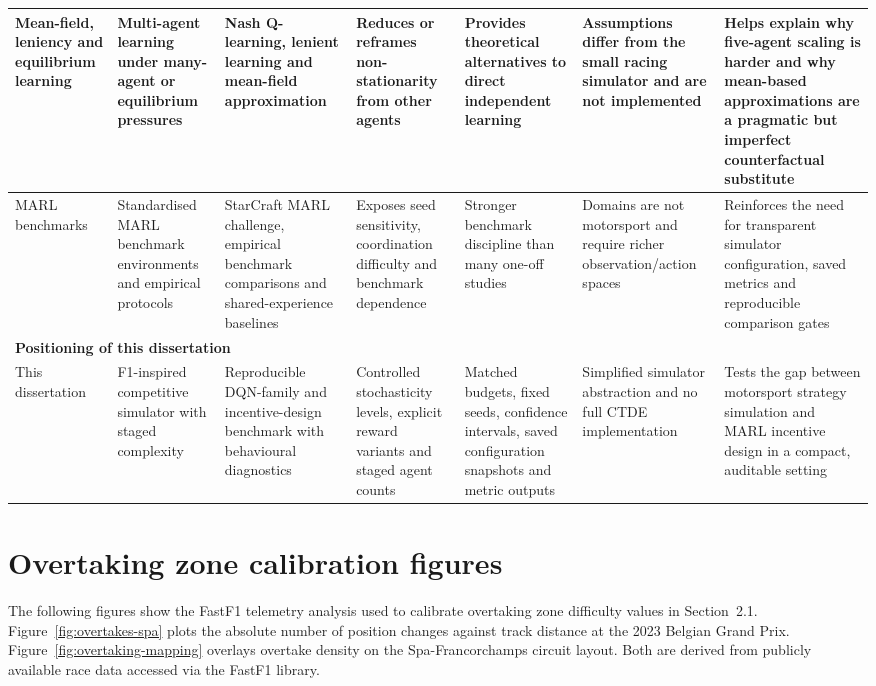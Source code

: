 \begin{appendices}
\begin{longtable}{|p{2.0cm}|p{2.1cm}|p{2.0cm}|p{2.0cm}|p{2.0cm}|p{2.2cm}|p{2.4cm}|}
\hline
Mean-field, leniency and equilibrium learning \citep{hu2003nash,wei2016lenient,yang2018meanfield} & Multi-agent learning under many-agent or equilibrium pressures & Nash Q-learning, lenient learning and mean-field approximation & Reduces or reframes non-stationarity from other agents & Provides theoretical alternatives to direct independent learning & Assumptions differ from the small racing simulator and are not implemented & Helps explain why five-agent scaling is harder and why mean-based approximations are a pragmatic but imperfect counterfactual substitute \\
\hline
MARL benchmarks \citep{samvelyan2019smac,papoudakis2021benchmarking,christianos2020seac} & Standardised MARL benchmark environments and empirical protocols & StarCraft MARL challenge, empirical benchmark comparisons and shared-experience baselines & Exposes seed sensitivity, coordination difficulty and benchmark dependence & Stronger benchmark discipline than many one-off studies & Domains are not motorsport and require richer observation/action spaces & Reinforces the need for transparent simulator configuration, saved metrics and reproducible comparison gates \\
\hline
\multicolumn{7}{|l|}{\textbf{Positioning of this dissertation}}\\
\hline
This dissertation & F1-inspired competitive simulator with staged complexity & Reproducible DQN-family and incentive-design benchmark with behavioural diagnostics & Controlled stochasticity levels, explicit reward variants and staged agent counts & Matched budgets, fixed seeds, confidence intervals, saved configuration snapshots and metric outputs & Simplified simulator abstraction and no full CTDE implementation & Tests the gap between motorsport strategy simulation and MARL incentive design in a compact, auditable setting \\
\hline
\end{longtable}
\endgroup



\section*{Overtaking zone calibration figures}
\label{sec:overtaking-figures}

The following figures show the FastF1 telemetry analysis used to calibrate overtaking zone difficulty values in Section~2.1. Figure~\ref{fig:overtakes-spa} plots the absolute number of position changes against track distance at the 2023 Belgian Grand Prix. Figure~\ref{fig:overtaking-mapping} overlays overtake density on the Spa-Francorchamps circuit layout. Both are derived from publicly available race data accessed via the FastF1 library.


\end{appendices}

